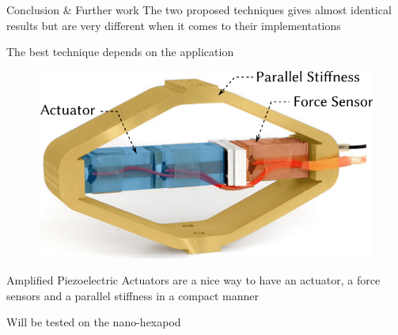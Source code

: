 \documentclass[t, minted]{clean-beamer}
\begin{document}
\begin{frame}[label={sec:org5db221d}]{Conclusion \& Further work}
The two proposed techniques gives almost identical results but are very different when it comes to their implementations

\vspace{2em}

The best technique depends on the application

\vspace{2em}

\begin{figure}
\vspace{-1em}
\begin{center}
\includegraphics[width=\linewidth]{figs/apa_schematic.pdf}
\end{center}
\end{figure}

Amplified Piezoelectric Actuators are a nice way to have an actuator, a force sensors and a parallel stiffness in a compact manner

\vspace{2em}

Will be tested on the nano-hexapod
\end{frame}
\end{document}
